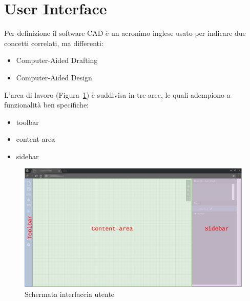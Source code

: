 \section{User Interface}
\label{sec:chapter_2_section_2}

Per definizione il software CAD è un acronimo inglese usato per indicare due concetti correlati, ma differenti:
\begin{itemize}
  \item Computer-Aided Drafting
  \item Computer-Aided Design
\end{itemize}

L'area di lavoro (Figura~\ref{fig:interfaccia}) è suddivisa in tre aree,
le quali adempiono a funzionalità ben specifiche:
\begin{itemize}
  \item toolbar
  \item content-area
  \item sidebar
\end{itemize}

\begin{figure}[htbp] %
   \centering
   \includegraphics[width=1\linewidth]{images/mock-interfaccia}
   \caption{Schermata interfaccia utente}
   \label{fig:interfaccia}
\end{figure}

